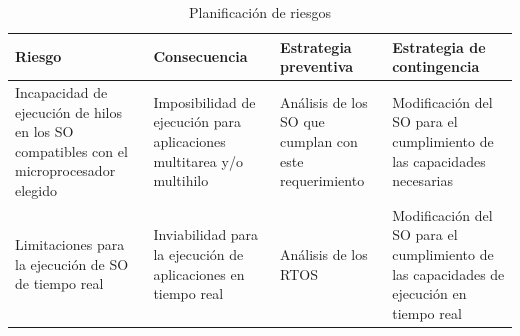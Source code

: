 		\newpage
		\begin{table}[!h]
		\centering
		\begin{tabular}{ p{4cm} p{4cm} p{4cm} p{3cm} }
		\hline 
		\rowcolor[gray]{0.8} Riesgo & Consecuencia & Estrategia preventiva & Estrategia de contingencia\\
		\hline
		Incapacidad de ejecución de hilos en los SO compatibles con el microprocesador elegido &  Imposibilidad de ejecución para aplicaciones multitarea y/o multihilo & Análisis de los SO que cumplan con este requerimiento & Modificación del SO para el cumplimiento de las capacidades necesarias\\
		\hline
		Limitaciones para la ejecución de SO de tiempo real& Inviabilidad para la ejecución de aplicaciones en tiempo real & Análisis de los RTOS & Modificación del SO  para el cumplimiento de las capacidades de ejecución en tiempo real \\
		\hline
		\end{tabular}
		\caption{Planificación de riesgos}
		\label{tab:planificación}
		\end{table}
		
	